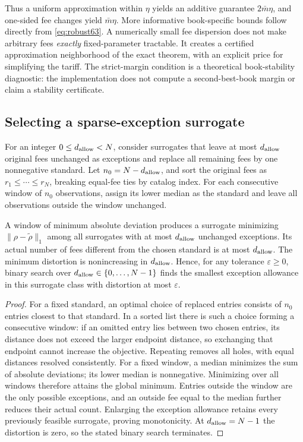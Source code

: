 Thus a uniform approximation within $\eta$ yields an additive guarantee $2\bar m\eta$, and one-sided fee changes yield $\bar m\eta$. More informative book-specific bounds follow directly from \eqref{eq:robust63}. A numerically small fee dispersion does not make arbitrary fees \emph{exactly} fixed-parameter tractable. It creates a certified approximation neighborhood of the exact theorem, with an explicit price for simplifying the tariff. The strict-margin condition is a theoretical book-stability diagnostic: the implementation does not compute a second-best-book margin or claim a stability certificate.

\subsection{Selecting a sparse-exception surrogate}
For an integer $0\leq d_{\rm allow}<N$, consider surrogates that leave at most $d_{\rm allow}$ original fees unchanged as exceptions and replace all remaining fees by one nonnegative standard. Let $n_0=N-d_{\rm allow}$, and sort the original fees as $r_1\leq\cdots\leq r_N$, breaking equal-fee ties by catalog index. For each consecutive window of $n_0$ observations, assign its lower median as the standard and leave all observations outside the window unchanged.
\begin{proposition}\label{prop:projection63}
A window of minimum absolute deviation produces a surrogate minimizing $\|\rho-\widetilde\rho\|_1$ among all surrogates with at most $d_{\rm allow}$ unchanged exceptions. Its actual number of fees different from the chosen standard is at most $d_{\rm allow}$. The minimum distortion is nonincreasing in $d_{\rm allow}$. Hence, for any tolerance $\varepsilon\geq0$, binary search over $d_{\rm allow}\in\{0,\ldots,N-1\}$ finds the smallest exception allowance in this surrogate class with distortion at most $\varepsilon$.
\end{proposition}
\begin{proof}
For a fixed standard, an optimal choice of replaced entries consists of $n_0$ entries closest to that standard. In a sorted list there is such a choice forming a consecutive window: if an omitted entry lies between two chosen entries, its distance does not exceed the larger endpoint distance, so exchanging that endpoint cannot increase the objective. Repeating removes all holes, with equal distances resolved consistently. For a fixed window, a median minimizes the sum of absolute deviations; its lower median is nonnegative. Minimizing over all windows therefore attains the global minimum. Entries outside the window are the only possible exceptions, and an outside fee equal to the median further reduces their actual count. Enlarging the exception allowance retains every previously feasible surrogate, proving monotonicity. At $d_{\rm allow}=N-1$ the distortion is zero, so the stated binary search terminates.
\end{proof}

